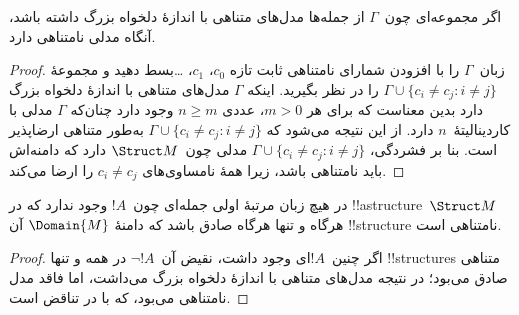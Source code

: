 \documentclass[../../../include/open-logic-section]{subfiles}
\begin{document}

\begin{thm}
 اگر مجموعه‌ای چون~$\Gamma$ از جمله‌ها مدل‌های
متناهی با اندازهٔ دلخواه بزرگ داشته باشد، آنگاه مدلی نامتناهی دارد.
\end{thm}

\begin{proof}
زبان~$\Gamma$ را با افزودن شمارای نامتناهی ثابت تازه
$c_0$، $c_1$، \dots بسط دهید و مجموعهٔ
$\Gamma \cup \{c_i \neq c_j : i \neq j\}$ را در نظر بگیرید. اینکه
$\Gamma$ مدل‌های متناهی با اندازهٔ دلخواه بزرگ دارد بدین معناست که برای
هر $m >0$، عددی $n\ge m$ وجود دارد چنان‌که $\Gamma$ مدلی با
کاردینالیتهٔ~$n$ دارد. از این نتیجه می‌شود که
$\Gamma \cup \{c_i \neq c_j : i \neq j\}$ به‌طور متناهی ارضاپذیر
است. بنا بر فشردگی، $\Gamma \cup \{c_i \neq c_j : i \neq j\}$ مدلی
چون~$\Struct M$ دارد که دامنه‌اش باید نامتناهی باشد، زیرا همهٔ نامساوی‌های
$c_i \neq c_j$ را ارضا می‌کند.
\end{proof}

\begin{prop}
در هیچ زبان مرتبهٔ اولی جمله‌ای چون~$!A$ وجود ندارد که در
!!a{structure}~$\Struct M$ هرگاه و تنها هرگاه صادق باشد که دامنهٔ
$\Domain{M}$ آن !!{structure} نامتناهی است.
\end{prop}

\begin{proof}
اگر چنین~$!A$ای وجود داشت، نقیض آن~$\lnot !A$ در همه و تنها
!!{structure}s متناهی صادق می‌بود؛ در نتیجه مدل‌های متناهی با اندازهٔ
دلخواه بزرگ می‌داشت، اما فاقد مدل نامتناهی می‌بود، که با
 در تناقض است.
\end{proof}
\end{document}
